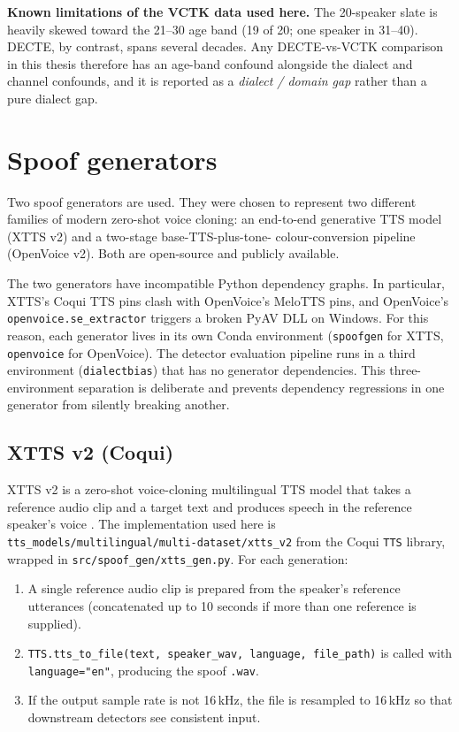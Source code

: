 \textbf{Known limitations of the VCTK data used here.} The
20-speaker slate is heavily skewed toward the 21--30 age band (19 of
20; one speaker in 31--40). DECTE, by contrast, spans several
decades. Any DECTE-vs-VCTK comparison in this thesis therefore has
an age-band confound alongside the dialect and channel confounds,
and it is reported as a \emph{dialect / domain gap} rather than a
pure dialect gap.


\section{Spoof generators}
\label{sec:methodology-spoof-generation}

Two spoof generators are used. They were chosen to represent two
different families of modern zero-shot voice cloning: an end-to-end
generative TTS model (XTTS v2) and a two-stage base-TTS-plus-tone-%
colour-conversion pipeline (OpenVoice v2). Both are open-source and
publicly available.

The two generators have incompatible Python dependency graphs. In
particular, XTTS's Coqui TTS pins clash with OpenVoice's MeloTTS
pins, and OpenVoice's \texttt{openvoice.se\_extractor} triggers a
broken PyAV DLL on Windows. For this reason, each generator lives in
its own Conda environment (\texttt{spoofgen} for XTTS,
\texttt{openvoice} for OpenVoice). The detector evaluation pipeline
runs in a third environment (\texttt{dialectbias}) that has no
generator dependencies. This three-environment separation is
deliberate and prevents dependency regressions in one generator from
silently breaking another.

\subsection{XTTS v2 (Coqui)}
\label{sec:methodology-generators-xtts}

XTTS v2 is a zero-shot voice-cloning multilingual TTS model that
takes a reference audio clip and a target text and produces speech
in the reference speaker's voice \cite{Casanova2024_XTTS}. The
implementation used here is
\texttt{tts\_models/multilingual/multi-dataset/xtts\_v2} from the
Coqui \texttt{TTS} library, wrapped in
\texttt{src/spoof\_gen/xtts\_gen.py}. For each generation:

\begin{enumerate}
    \item A single reference audio clip is prepared from the speaker's
        reference utterances (concatenated up to 10 seconds if more than
        one reference is supplied).
    \item \texttt{TTS.tts\_to\_file(text, speaker\_wav, language, file\_path)} is
        called with \texttt{language="en"}, producing the spoof \texttt{.wav}.
    \item If the output sample rate is not 16\,kHz, the file is resampled to
        16\,kHz so that downstream detectors see consistent input.
\end{enumerate}

